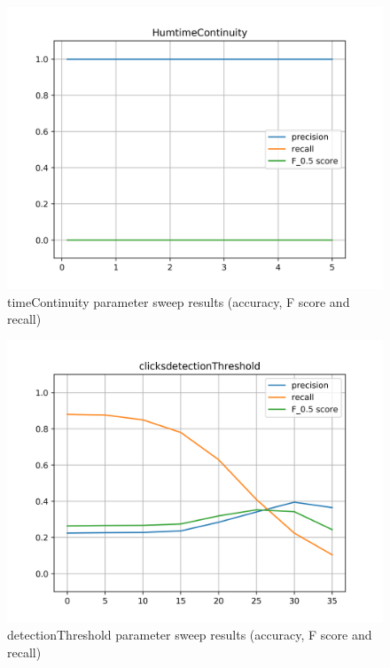 \begin{figure}[!ht]
	\includegraphics[clip,width=\columnwidth]{Figures/HumtimeContinuity.png}%
	\caption{timeContinuity parameter sweep results (accuracy, F score and recall)}
	\label{fig:humtimeContinuity}
\end{figure}

\begin{figure}[!ht]
	\includegraphics[clip,width=\columnwidth]{Figures/clicksdetectionThreshold.png}%
	\caption{detectionThreshold parameter sweep results (accuracy, F score and recall)}
	\label{fig:clicksdetectionThreshold}
\end{figure}

